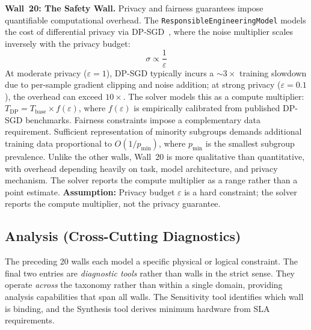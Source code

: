 \documentclass[10pt,twocolumn]{article}
\begin{document}
\textbf{Wall~20: The Safety Wall.} Privacy and fairness guarantees impose quantifiable computational overhead. The \texttt{ResponsibleEngineeringModel} models the cost of differential privacy via DP-SGD~\citep{abadi2016}, where the noise multiplier scales inversely with the privacy budget:
\begin{equation}
\label{eq:dpsgd}
\sigma \propto \frac{1}{\varepsilon}
\end{equation}
At moderate privacy ($\varepsilon = 1$), DP-SGD typically incurs a ${\sim}3{\times}$ training slowdown due to per-sample gradient clipping and noise addition; at strong privacy ($\varepsilon = 0.1$), the overhead can exceed $10{\times}$. The solver models this as a compute multiplier: $T_{\text{DP}} = T_{\text{base}} \times f(\varepsilon)$, where $f(\varepsilon)$ is empirically calibrated from published DP-SGD benchmarks. Fairness constraints impose a complementary data requirement. Sufficient representation of minority subgroups demands additional training data proportional to $O(1/p_{\min})$, where $p_{\min}$ is the smallest subgroup prevalence. Unlike the other walls, Wall~20 is more qualitative than quantitative, with overhead depending heavily on task, model architecture, and privacy mechanism. The solver reports the compute multiplier as a range rather than a point estimate. \textbf{Assumption:} Privacy budget $\varepsilon$ is a hard constraint; the solver reports the compute multiplier, not the privacy guarantee.

\subsection{Analysis (Cross-Cutting Diagnostics)}
\label{sec:walls-analysis}

The preceding 20 walls each model a specific physical or logical constraint. The final two entries are \emph{diagnostic tools} rather than walls in the strict sense. They operate \emph{across} the taxonomy rather than within a single domain, providing analysis capabilities that span all walls. The Sensitivity tool identifies which wall is binding, and the Synthesis tool derives minimum hardware from SLA requirements.
\end{document}
